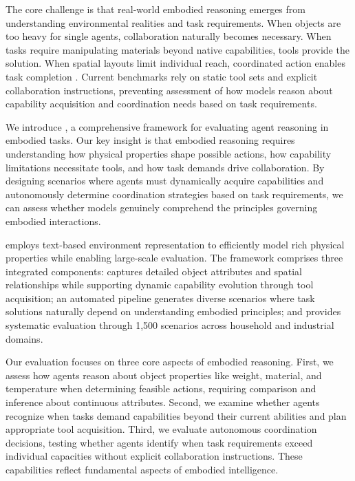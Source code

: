 The core challenge is that real-world embodied reasoning emerges from understanding environmental realities and task requirements. 
When objects are too heavy for single agents, collaboration naturally becomes necessary. When tasks require manipulating materials beyond native capabilities, tools provide the solution. When spatial layouts limit individual reach, coordinated action enables task completion \citep{zeng2022socraticmodelscomposingzeroshot, wang2023voyageropenendedembodiedagent}. Current benchmarks rely on static tool sets and explicit collaboration instructions, preventing assessment of how models reason about capability acquisition and coordination needs based on task requirements.

We introduce \framework, a comprehensive framework for evaluating agent reasoning in embodied tasks. Our key insight is that embodied reasoning requires understanding how physical properties shape possible actions, how capability limitations necessitate tools, and how task demands drive collaboration.
By designing scenarios where agents must dynamically acquire capabilities and autonomously determine coordination strategies based on task requirements, we can assess whether models genuinely comprehend the principles governing embodied interactions.

\framework employs text-based environment representation to efficiently model rich physical properties while enabling large-scale evaluation. The framework comprises three integrated components: \simulator captures detailed object attributes and spatial relationships while supporting dynamic capability evolution through tool acquisition; an automated pipeline generates diverse scenarios where task solutions naturally depend on understanding embodied principles; and \benchmark provides systematic evaluation through 1,500 scenarios across household and industrial domains.

Our evaluation focuses on three core aspects of embodied reasoning. First, we assess how agents reason about object properties like weight, material, and temperature when determining feasible actions, requiring comparison and inference about continuous attributes. Second, we examine whether agents recognize when tasks demand capabilities beyond their current abilities and plan appropriate tool acquisition. Third, we evaluate autonomous coordination decisions, testing whether agents identify when task requirements exceed individual capacities without explicit collaboration instructions. These capabilities reflect fundamental aspects of embodied intelligence.


